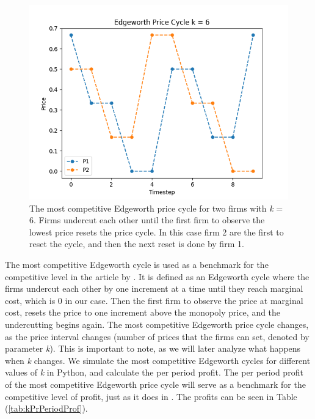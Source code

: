 \documentclass{article}
\begin{document}
\begin{figure}[H]
    \centering
    \includegraphics[scale = 0.75]{Edgeworth price cycle k = 6.png}
    \caption{The most competitive Edgeworth price cycle for two firms with \textit{k} = 6. Firms undercut each other until the first firm to observe the lowest price resets the price cycle. In this case firm 2 are the first to reset the cycle, and then the next reset is done by firm 1.}
    \label{fig:EdgeworthCycle}
\end{figure}
The most competitive Edgeworth cycle is used as a benchmark for the competitive level in the article by \cite{Klein2021}. It is defined as an Edgeworth cycle where the firms undercut each other by one increment at a time until they reach marginal cost, which is 0 in our case. Then the first firm to observe the price at marginal cost, resets the price to one increment above the monopoly price, and the undercutting begins again.
The most competitive Edgeworth price cycle changes, as the price interval changes (number of prices that the firms can set, denoted by parameter \textit{k}). This is important to note, as we will later analyze what happens when \textit{k} changes. 
\newline
We simulate the most competitive Edgeworth cycles for different values of \textit{k} in Python, and calculate the per period profit.
The per period profit of the most competitive Edgeworth price cycle will serve as a benchmark for the competitive level of profit, just as it does in \cite{Klein2021}. The profits can be seen in Table (\ref{tab:kPrPeriodProf}).
\end{document}

